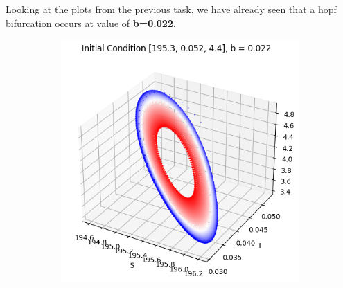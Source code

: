\begin{itemize}
Looking at the plots from the previous task, we have already seen that a hopf bifurcation occurs at value of \textbf{b=0.022.}


\begin{figure}[H]
\centering
\begin{subfigure}[b]{0.3\textwidth}
    \centering
    \includegraphics[width=\textwidth]{images/task5/ex4_t5_4_1.png}
    \label{fig:subfig_c1}
\end{subfigure}
\begin{subfigure}[b]{0.3\textwidth}
    \centering

\end{subfigure}
\end{figure}
\end{itemize}
